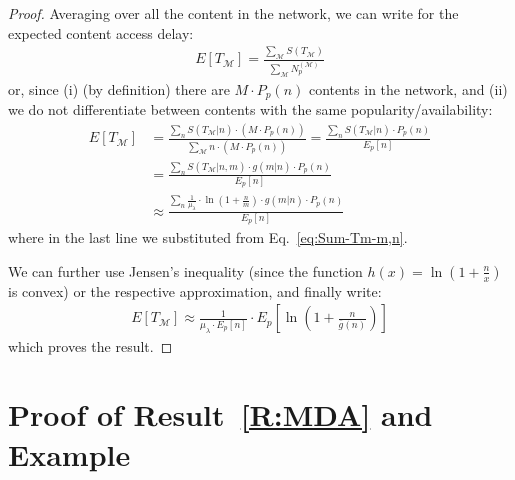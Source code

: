\documentclass[journal]{IEEEtran}
\newcommand{\eq}[1]{Eq.~\eqref{#1}}
\newcommand{\Np}{N_{p}^{(\mathcal{M})}}
\begin{document}
\begin{proof}
Averaging over all the content in the network, we can write for the expected content access delay:
\begin{align}
E[T_{\mathcal{M}}] = \frac{\sum_{\mathcal{M}}S(T_{\mathcal{M}})}{\sum_{\mathcal{M}}\Np}
\end{align}
or, since (i) (by definition) there are $M\cdot P_{p}(n)$ contents in the network, and (ii) we do not differentiate between contents with the same popularity/availability:
\begin{align}
E[T_{\mathcal{M}}] &= \frac{\sum_{n}S(T_{\mathcal{M}}|n)\cdot (M\cdot P_{p}(n))}{\sum_{\mathcal{M}}n\cdot(M\cdot P_{p}(n))}= \frac{\sum_{n}S(T_{\mathcal{M}}|n) \cdot P_{p}(n)}{E_{p}[n]}\nonumber\\
&= \frac{\sum_{n}S(T_{\mathcal{M}}|n,m)\cdot g(m|n) \cdot P_{p}(n)}{E_{p}[n]}\nonumber\\
&\approx \frac{\sum_{n}\frac{1}{ \mu_{\lambda}}\cdot \ln\left(1+\frac{n}{m}\right)\cdot g(m|n) \cdot P_{p}(n)}{E_{p}[n]}
\end{align}
where in the last line we substituted from \eq{eq:Sum-Tm-m,n}.

We can further use Jensen's inequality (since the function $h(x) = \ln\left(1+\frac{n}{x}\right)$ is convex) or the respective approximation, and finally write:
\begin{align}
E[T_{\mathcal{M}}] \approx \frac{1}{\mu_{\lambda}\cdot E_{p}[n]}\cdot E_{p}\left[ \ln\left(1+\frac{n}{\overline{g}(n)}\right)\right]
\end{align}
which proves the result.
\end{proof}

\section{Proof of Result~\ref{R:MDA} and Example}\label{appendix:R:MDA}
\end{document}
